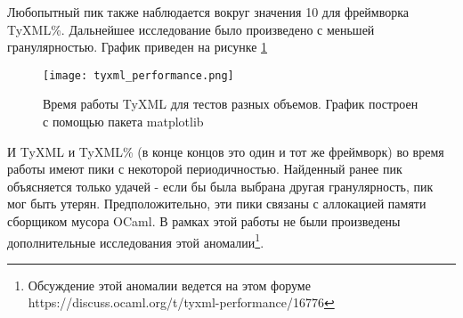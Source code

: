
Любопытный пик также наблюдается вокруг значения 10 для фреймворка TyXML\%.
Дальнейшее исследование было произведено с меньшей гранулярностью.
График приведен на рисунке \ref{fig:tyxml_perfomance}
\begin{figure}[h!]
    \texttt{[image: tyxml\_performance.png]}
    \label{fig:tyxml_perfomance}
    \caption{Время работы TyXML для тестов разных объемов. График построен с помощью пакета matplotlib}
\end{figure}

И TyXML и TyXML\% (в конце концов это один и тот же фреймворк) во время работы имеют пики с некоторой периодичностью.
Найденный ранее пик объясняется только удачей - если бы была выбрана другая гранулярность, пик мог быть утерян.
Предположительно, эти пики связаны с аллокацией памяти сборщиком мусора OCaml.
В рамках этой работы не были произведены дополнительные исследования этой аномалии\footnote{Обсуждение этой аномалии ведется на этом форуме https://discuss.ocaml.org/t/tyxml-performance/16776}. %
